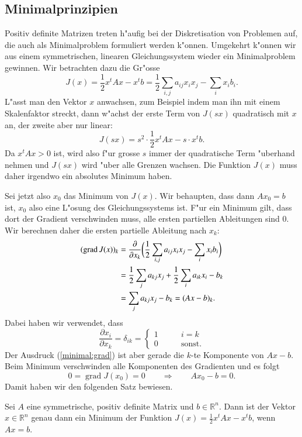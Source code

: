 \subsection{Minimalprinzipien}
Positiv definite Matrizen treten h"aufig bei der Diskretisation von 
Problemen auf, die auch als Minimalproblem formuliert werden k"onnen.
Umgekehrt k"onnen wir aus einem symmetrischen, linearen Gleichungssystem
wieder ein Minimalproblem gewinnen.
Wir betrachten dazu die Gr"osse
\[
J(x)=\frac12x^tAx-x^tb =
\frac12\sum_{i,j}a_{ij}x_ix_j-\sum_ix_ib_i.
\]
L"asst man den Vektor $x$ anwachsen, zum Beispiel indem man ihn mit
einem Skalenfaktor streckt, dann w"achst der erste Term von $J(sx)$
quadratisch mit $x$ an, der zweite aber nur linear:
\[
J(sx)=s^2\cdot\frac12x^tAx - s\cdot x^tb.
\]
Da $x^tAx >0$ ist, wird also f"ur grosse $s$ immer der quadratische
Term "uberhand nehmen und $J(sx)$ wird "uber alle Grenzen wachsen.
Die Funktion $J(x)$ muss daher irgendwo ein absolutes Minimum
haben.

Sei jetzt also $x_0$ das Minimum von $J(x)$.
Wir behaupten, dass dann $Ax_0=b$ ist, $x_0$ also eine L"osung des
Gleichungssystems ist.
F"ur ein Minimum gilt, dass dort der Gradient verschwinden muss,
alle ersten partiellen Ableitungen sind $0$.
Wir berechnen daher die ersten partielle Ableitung nach $x_k$:
\begin{align}
(\operatorname{grad}J(x))_k
&=
\frac{\partial}{\partial x_k}\biggl(
\frac12\sum_{i,j}a_{ij}x_ix_j-\sum_ix_ib_i\biggr)
\notag
\\
&=
\frac12\sum_j a_{kj}x_j+\frac12\sum_i a_{ik}x_i-b_k
\notag
\\
&=\sum_j a_{kj}x_j-b_k = (Ax-b)_k.
\label{minimal:grad}
\end{align}
Dabei haben wir verwendet, dass
\[
\frac{\partial x_i}{\partial x_k}=\delta_{ik}=\begin{cases}1&\qquad i=k\\
0&\qquad\text{sonst.}\end{cases}
\]
Der Ausdruck (\ref{minimal:grad}) ist aber gerade die $k$-te Komponente
von $Ax-b$.
Beim Minimum verschwinden alle Komponenten des Gradienten und es folgt
\[
0=\operatorname{grad}J(x_0) = 0\qquad\Rightarrow\qquad Ax_0-b=0.
\]
Damit haben wir den folgenden Satz bewiesen.

\begin{satz}
Sei $A$ eine symmetrische, positiv definite Matrix und $b\in\mathbb R^n$.
Dann ist der Vektor $x\in\mathbb R^n$ genau dann ein Minimum 
der Funktion $J(x)=\frac12x^tAx-x^tb$, wenn $Ax=b$.
\end{satz}

